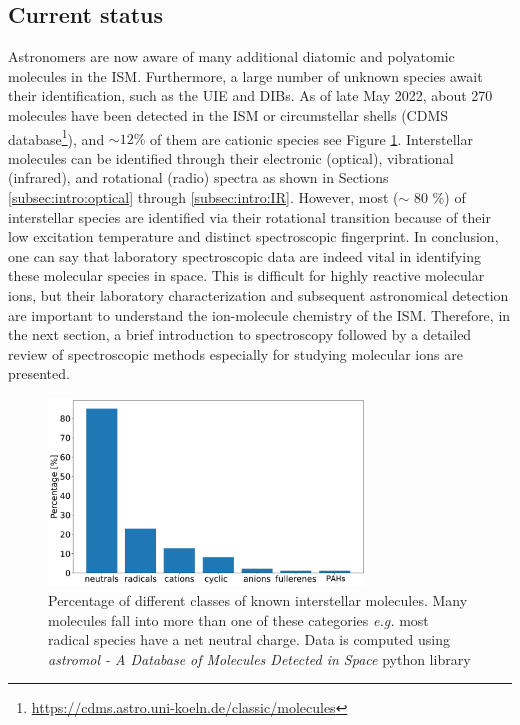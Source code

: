 \subsection{Current status}
Astronomers are now aware of many additional diatomic and polyatomic molecules in the ISM. Furthermore, a large number of unknown species await their identification, such as the UIE and DIBs. As of late May 2022, about 270 molecules have been detected in the ISM or circumstellar shells (CDMS database\footnote{\url{https://cdms.astro.uni-koeln.de/classic/molecules}}), and $\sim 12 \%$ of them are cationic species \cite{mcguire_2021_2021} see Figure \ref{fig:ISM_molecules}. Interstellar molecules can be identified through their electronic (optical), vibrational (infrared), and rotational (radio) spectra as shown in Sections \ref{subsec:intro:optical} through \ref{subsec:intro:IR}. However, most ($\sim$ 80 \%) of interstellar species are identified via their rotational transition \cite{mcguire_2021_2021} because of their low excitation temperature and distinct spectroscopic  fingerprint. In conclusion, one can say that laboratory spectroscopic data are indeed vital in identifying these molecular species in space. This is difficult for highly reactive molecular ions, but their laboratory characterization and subsequent astronomical detection are important to understand the ion-molecule chemistry of the ISM. Therefore, in the next section, a brief introduction to spectroscopy followed by a detailed review of spectroscopic methods especially for studying molecular ions are presented.

\begin{figure}[!htb]
    \centering
    \includegraphics[width=0.75\textwidth]{figures/intro/known_molecules_in_space.pdf}
    \caption{Percentage of different classes of  known interstellar molecules. Many molecules fall into more than one of these categories \emph{e.g.} most radical species have a net neutral charge. Data is computed using \emph{astromol - A Database of Molecules Detected in Space} python library \cite{mcguire_astromol_2021}}
    \label{fig:ISM_molecules}
\end{figure}
